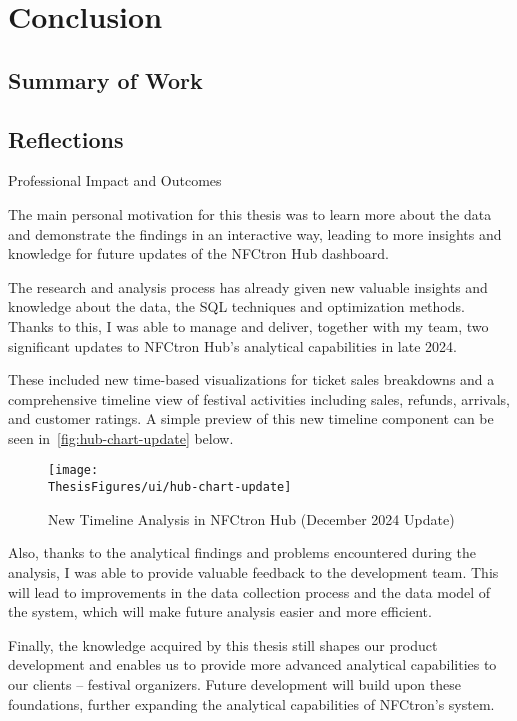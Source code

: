 \chapter{Conclusion}
\label{ch:conclusion}


\section{Summary of Work}
\label{sec:conclusion-summary}


\section{Reflections}
\label{sec:conclusion-reflections}


\begin{section}{Professional Impact and Outcomes}
	\label{sec:future-impact}

	The main personal motivation for this thesis was to learn more about the data and demonstrate the findings in an interactive way, leading to more insights and knowledge for future updates of the NFCtron Hub dashboard.

	The research and analysis process has already given new valuable insights and knowledge about the data, the SQL techniques and optimization methods.
	Thanks to this, I was able to manage and deliver, together with my team, two significant updates to NFCtron Hub's analytical capabilities in late 2024.

	These included new time-based visualizations for ticket sales breakdowns and a comprehensive timeline view of festival activities including sales, refunds, arrivals, and customer ratings.
	A simple preview of this new timeline component can be seen in~\autoref{fig:hub-chart-update} below.

	\begin{figure}[H]
		\centering
		\texttt{[image: \\ThesisFigures/ui/hub-chart-update]}
		\caption{New Timeline Analysis in NFCtron Hub (December 2024 Update)}
		\label{fig:hub-chart-update}
	\end{figure}

	Also, thanks to the analytical findings and problems encountered during the analysis, I was able to provide valuable feedback to the development team.
	This will lead to improvements in the data collection process and the data model of the system, which will make future analysis easier and more efficient.

	Finally, the knowledge acquired by this thesis still shapes our product development and enables us to provide more advanced analytical capabilities to our clients – festival organizers.
	Future development will build upon these foundations, further expanding the analytical capabilities of NFCtron's system.
\end{section}